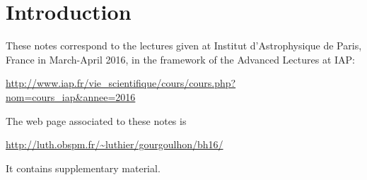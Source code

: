 \chapter{Introduction}

These notes correspond to the lectures given at
Institut d'Astrophysique de Paris, France in March-April 2016, in the
framework of the Advanced Lectures at IAP:

\centerline{\url{http://www.iap.fr/vie_scientifique/cours/cours.php?nom=cours_iap&annee=2016}}

\vspace{2ex}

The web page associated to these notes is

\centerline{\url{http://luth.obspm.fr/~luthier/gourgoulhon/bh16/}}

It contains supplementary material.
